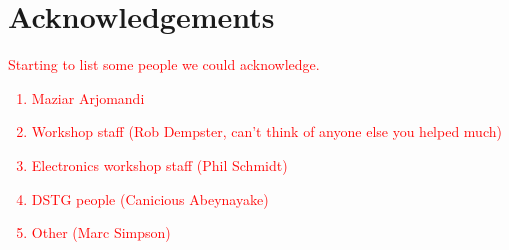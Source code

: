 \documentclass[main.tex]{subfiles}
\begin{document}
{}	%
\chapter*{Acknowledgements} 
\textcolor{red}{Starting to list some people we could acknowledge.
\begin{enumerate}
\item Maziar Arjomandi
\item Workshop staff (Rob Dempster, can't think of anyone else you helped much)
\item Electronics workshop staff (Phil Schmidt)
\item DSTG people (Canicious Abeynayake)
\item Other (Marc Simpson)
\end{enumerate}}
\newpage

{}	%
\tableofcontents
\newpage

{}	%
\listoffigures
\newpage

{}	%
\listoftables
\newpage


\printnomenclature
\newpage
\end{document}

